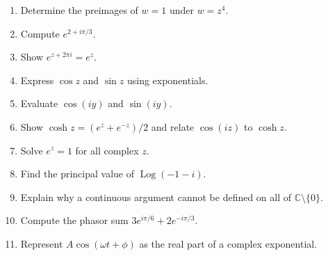 \begin{enumerate}[label=\textbf{\arabic*.},leftmargin=*]
\item Determine the preimages of $w=1$ under $w=z^4$.
\item Compute $e^{2+i\pi/3}$.
\item Show $e^{z+2\pi i}=e^z$.
\item Express $\cos z$ and $\sin z$ using exponentials.
\item Evaluate $\cos(iy)$ and $\sin(iy)$.
\item Show $\cosh z=(e^z+e^{-z})/2$ and relate $\cos(iz)$ to $\cosh z$.
\item Solve $e^z=1$ for all complex $z$.
\item Find the principal value of $\operatorname{Log}(-1-i)$.
\item Explain why a continuous argument cannot be defined on all of $\mathbb C\setminus\{0\}$.
\item Compute the phasor sum $3e^{i\pi/6}+2e^{-i\pi/3}$.
\item Represent $A\cos(\omega t+\phi)$ as the real part of a complex exponential.
\end{enumerate}

